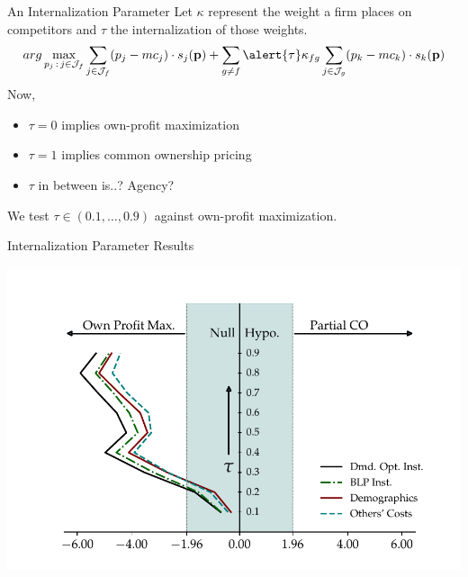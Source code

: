 \begin{frame}[plain]{An Internalization Parameter}
Let $\kappa$ represent the weight a firm places on competitors and $\tau$ the internalization of those weights.
 \begin{equation*}
 arg\max_{p_j \,:\, j \in \mathcal{J}_f} \sum_{j \in \mathcal{J}_f} (p_j - mc_j) \cdot s_j(\mathbf{p})+
 \sum_{g\neq f} \alert{\tau} \kappa_{fg} \sum_{j \in \mathcal{J}_g} (p_k - mc_k) \cdot s_k(\mathbf{p})
 \end{equation*}
Now, 
\begin{itemize}
\item $\tau = 0$ implies own-profit maximization
\item $\tau = 1$ implies common ownership pricing
\item $\tau$ in between is..? Agency?
\end{itemize}
We test $\tau \in (0.1, \ldots, 0.9)$ against own-profit maximization.
\end{frame}

\begin{frame}[plain]{Internalization Parameter Results}
\begin{center}
\includegraphics[height=\textheight]{resources/tau_figure2.pdf}
\end{center}
\end{frame}










